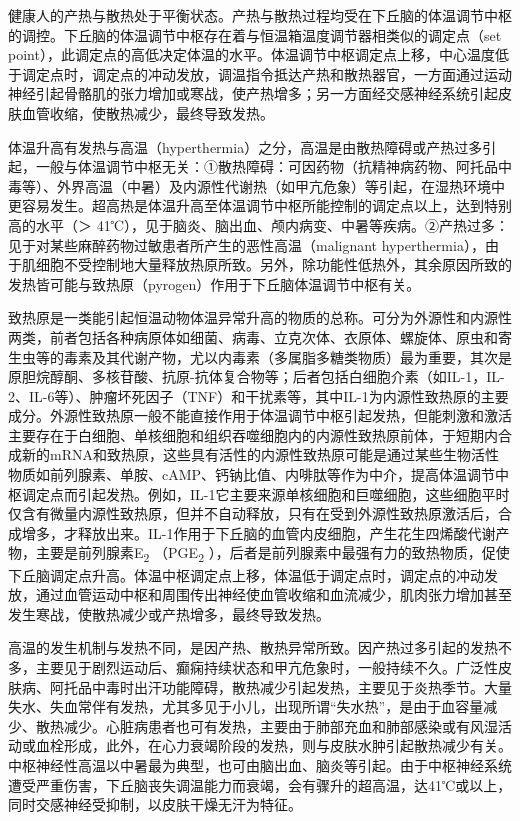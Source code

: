 健康人的产热与散热处于平衡状态。产热与散热过程均受在下丘脑的体温调节中枢的调控。下丘脑的体温调节中枢存在着与恒温箱温度调节器相类似的调定点（set
point），此调定点的高低决定体温的水平。体温调节中枢调定点上移，中心温度低于调定点时，调定点的冲动发放，调温指令抵达产热和散热器官，一方面通过运动神经引起骨骼肌的张力增加或寒战，使产热增多；另一方面经交感神经系统引起皮肤血管收缩，使散热减少，最终导致发热。

体温升高有发热与高温（hyperthermia）之分，高温是由散热障碍或产热过多引起，一般与体温调节中枢无关：①散热障碍：可因药物（抗精神病药物、阿托品中毒等）、外界高温（中暑）及内源性代谢热（如甲亢危象）等引起，在湿热环境中更容易发生。超高热是体温升高至体温调节中枢所能控制的调定点以上，达到特别高的水平（＞
41℃），见于脑炎、脑出血、颅内病变、中暑等疾病。②产热过多：见于对某些麻醉药物过敏患者所产生的恶性高温（malignant
hyperthermia），由于肌细胞不受控制地大量释放热原所致。另外，除功能性低热外，其余原因所致的发热皆可能与致热原（pyrogen）作用于下丘脑体温调节中枢有关。

致热原是一类能引起恒温动物体温异常升高的物质的总称。可分为外源性和内源性两类，前者包括各种病原体如细菌、病毒、立克次体、衣原体、螺旋体、原虫和寄生虫等的毒素及其代谢产物，尤以内毒素（多属脂多糖类物质）最为重要，其次是原胆烷醇酮、多核苷酸、抗原-抗体复合物等；后者包括白细胞介素（如IL-1，IL-2、IL-6等）、肿瘤坏死因子（TNF）和干扰素等，其中IL-1为内源性致热原的主要成分。外源性致热原一般不能直接作用于体温调节中枢引起发热，但能刺激和激活主要存在于白细胞、单核细胞和组织吞噬细胞内的内源性致热原前体，于短期内合成新的mRNA和致热原，这些具有活性的内源性致热原可能是通过某些生物活性物质如前列腺素、单胺、cAMP、钙钠比值、内啡肽等作为中介，提高体温调节中枢调定点而引起发热。例如，IL-1它主要来源单核细胞和巨噬细胞，这些细胞平时仅含有微量内源性致热原，但并不自动释放，只有在受到外源性致热原激活后，合成增多，才释放出来。IL-1作用于下丘脑的血管内皮细胞，产生花生四烯酸代谢产物，主要是前列腺素E\textsubscript{2}
（PGE\textsubscript{2}
），后者是前列腺素中最强有力的致热物质，促使下丘脑调定点升高。体温中枢调定点上移，体温低于调定点时，调定点的冲动发放，通过血管运动中枢和周围传出神经使血管收缩和血流减少，肌肉张力增加甚至发生寒战，使散热减少或产热增多，最终导致发热。

高温的发生机制与发热不同，是因产热、散热异常所致。因产热过多引起的发热不多，主要见于剧烈运动后、癫痫持续状态和甲亢危象时，一般持续不久。广泛性皮肤病、阿托品中毒时出汗功能障碍，散热减少引起发热，主要见于炎热季节。大量失水、失血常伴有发热，尤其多见于小儿，出现所谓“失水热”，是由于血容量减少、散热减少。心脏病患者也可有发热，主要由于肺部充血和肺部感染或有风湿活动或血栓形成，此外，在心力衰竭阶段的发热，则与皮肤水肿引起散热减少有关。中枢神经性高温以中暑最为典型，也可由脑出血、脑炎等引起。由于中枢神经系统遭受严重伤害，下丘脑丧失调温能力而衰竭，会有骤升的超高温，达41℃或以上，同时交感神经受抑制，以皮肤干燥无汗为特征。

